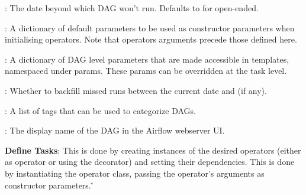 
\item {}: The date beyond which DAG won't run. Defaults to  for open-ended.
\item {}: A dictionary of default parameters to be used as constructor parameters when initialising
operators. Note that operators arguments precede those defined here.
\item {}: A dictionary of DAG level parameters that are made accessible in templates, namespaced under
params.
These params can be overridden at the task level.
\item {}: Whether to backfill missed runs between the current date and  (if any).
\item {}: A list of tags that can be used to categorize DAGs.
\item {}: The display name of the DAG in the Airflow webserver UI\@.
\eit
\item \textbf{Define Tasks}: This is done by creating instances of the desired operators (either as operator or using
the  decorator) and setting their dependencies. This is done by instantiating the operator class, passing
the operator's arguments as constructor parameters. \v

